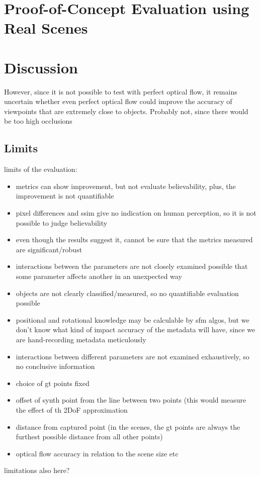 \section{Proof-of-Concept Evaluation using Real Scenes} \label{sec:pof_eval}

\section{Discussion} \label{sec:discussion}
 However, since it is not possible to test with perfect optical flow, it remains uncertain whether even perfect optical flow could improve the accuracy of viewpoints that are extremely close to objects. Probably not, since there would be too high occlusions

\subsection{Limits}

limits of the evaluation:
\begin{itemize}
  \item metrics can show improvement, but not evaluate believability, plus, the improvement is not quantifiable
  \item pixel differences and ssim give no indication on human perception, so it is not possible to judge believability
  \item even though the results suggest it, cannot be sure that the metrics measured are significant/robust
  \item interactions between the parameters are not closely examined \ar possible that some parameter affects another in an unexpected way
  \item objects are not clearly classified/measured, so no quantifiable evaluation possible
  \item positional and rotational knowledge may be calculable by sfm algos, but we don't know what kind of impact accuracy of the metadata will have, since we are hand-recording metadata meticulously
  \item interactions between different parameters are not examined exhaustively, so no conclusive information
\end{itemize}

\begin{itemize}
  \item choice of gt points \ar fixed
  \item \ar offset of synth point from the line between two points (this would measure the effect of th 2DoF approximation
  \item distance from captured point (in the scenes, the gt points are always the furthest possible distance from all other points)
  \item optical flow accuracy in relation to the scene size etc
\end{itemize}
limitations also here?

